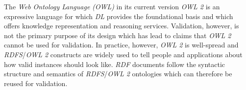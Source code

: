 \documentclass{acm_proc_article-sp}
\newcommand{\ms}[1]{%
  \texttt{#1}
}
\newcommand{\tb}[1]{\todo[size=\small, color=green!40]{\textbf{Thomas:} #1}}
\begin{document}
The \emph{Web Ontology Language (OWL)} in its current version \emph{OWL 2} is an expressive language 
for which \emph{DL} provides the foundational basis and
which offers knowledge representation and reasoning services. 
Validation, however, is not the primary purpose of its design which has lead to claims that \emph{OWL 2} cannot be used for validation. 
In practice, however, \emph{OWL 2} is well-spread and \emph{RDFS}/\emph{OWL 2} constructs are widely used to tell people and applications about how valid instances should look like.
\emph{RDF} documents follow the syntactic structure and semantics of \emph{RDFS}/\emph{OWL 2} ontologies which can therefore be reused for validation. 
\end{document}
